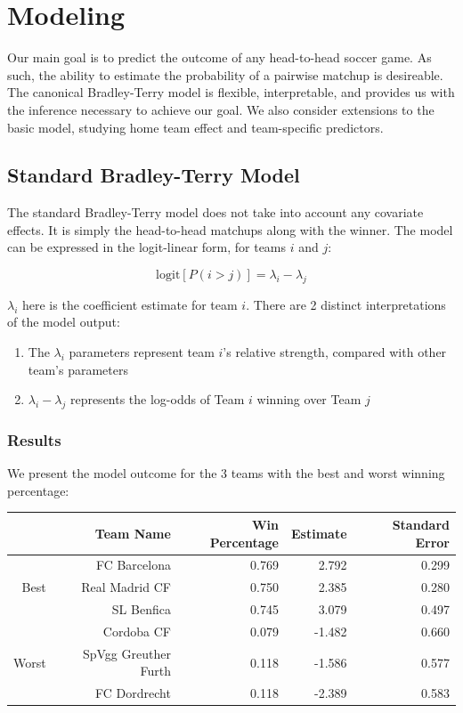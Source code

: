 \documentclass{article}
\begin{document}
\section{Modeling}

Our main goal is to predict the outcome of any head-to-head soccer game. As such, the ability to estimate the probability of a pairwise matchup is desireable. The canonical Bradley-Terry model is flexible, interpretable, and provides us with the inference necessary to achieve our goal. We also consider extensions to the basic model, studying home team effect and team-specific predictors.

\subsection{Standard Bradley-Terry Model}

The standard Bradley-Terry model does not take into account any covariate effects. It is simply the head-to-head matchups along with the winner. The model can be expressed in the logit-linear form, for teams $i$ and $j$:

$$\text{logit}[P(i > j)] = \lambda_i - \lambda_j$$

$\lambda_i$ here is the coefficient estimate for team $i$. There are 2 distinct interpretations of the model output:

\begin{enumerate}
	\item The $\lambda_i$ parameters represent team $i$'s relative strength, compared with other team's parameters
	\item $\lambda_i - \lambda_j$ represents the log-odds of Team $i$ winning over Team $j$
\end{enumerate}

\subsubsection{Results}

We present the model outcome for the 3 teams with the best and worst winning percentage:

\begin{table}[H]
\centering
\begin{tabular}{|r|rrrr|}
  \hline
 & Team Name & Win Percentage & Estimate & Standard Error \\ 
  \hline
   &  FC Barcelona & 0.769 & 2.792 & 0.299 \\ 
 Best  &  Real Madrid CF & 0.750 & 2.385 & 0.280 \\ 
   &  SL Benfica & 0.745 & 3.079 & 0.497 \\ \cline{1-5}
   &  Cordoba CF & 0.079 & -1.482 & 0.660 \\ 
Worst   &  SpVgg Greuther Furth & 0.118 & -1.586  & 0.577 \\ 
   & FC Dordrecht & 0.118 & -2.389 & 0.583 \\
   \hline
\end{tabular}
\end{table}
\end{document}
